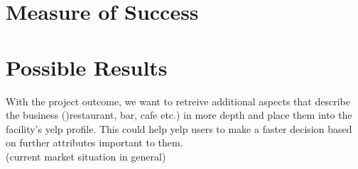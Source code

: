 \section{Measure of Success}
\label{cha:success}


\section{Possible Results}
\label{cha:conclusion}
With the project outcome, we want to retreive additional aspects that describe the business ()restaurant, bar, cafe etc.) in more depth and place them into the facility's yelp profile. This could help yelp users to make a faster decision based on further attributes important to them.\\ (current market situation in general)